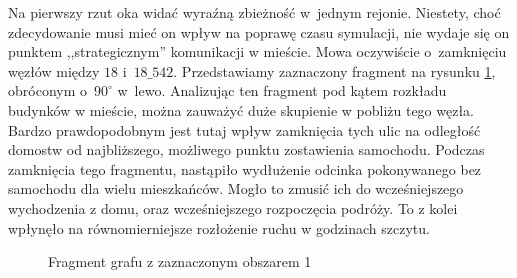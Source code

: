 \documentclass[twoside,12pt]{report}
\begin{document}
Na pierwszy rzut oka widać wyraźną zbieżność w~jednym rejonie. Niestety, choć zdecydowanie musi mieć on wpływ na poprawę czasu symulacji, nie wydaje się on punktem ,,strategicznym'' komunikacji w mieście. Mowa oczywiście o~zamknięciu węzłów między $18$ i~$18\_542$. Przedstawiamy zaznaczony fragment na rysunku \ref{fig:frag_1}, obróconym o~$90^{\circ}$ w~lewo. Analizując ten fragment pod kątem rozkładu budynków w mieście, można zauważyć duże skupienie w pobliżu tego węzła. Bardzo prawdopodobnym jest tutaj wpływ zamknięcia tych ulic na odległość domostw od najbliższego, możliwego punktu zostawienia samochodu. Podczas zamknięcia tego fragmentu, nastąpiło wydłużenie odcinka pokonywanego bez samochodu dla wielu mieszkańców. Mogło to zmusić ich do wcześniejszego wychodzenia z domu, oraz wcześniejszego rozpoczęcia podróży. To z kolei wpłynęło na równomierniejsze rozłożenie ruchu w godzinach szczytu.

\begin{figure}[htbp]
\centering
{}
\caption{Fragment grafu z zaznaczonym obszarem 1}
\label{fig:frag_1}
\end{figure}
\end{document}
